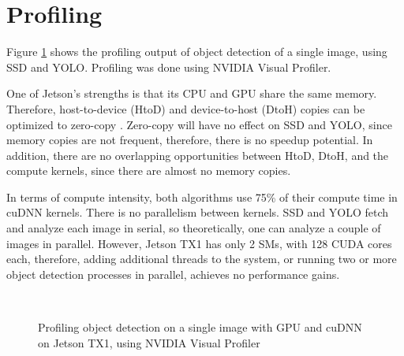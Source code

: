 \section{Profiling}
\label{sec:profiling}

Figure \ref{fig:profile} shows the profiling output of object detection of a single image, using SSD and YOLO. Profiling was done using NVIDIA Visual Profiler.

One of Jetson's strengths is that its CPU and GPU share the same memory. Therefore, host-to-device (HtoD) and device-to-host (DtoH) copies can be optimized to zero-copy \cite{tegrazerocopy}. Zero-copy will have no effect on SSD and YOLO, since memory copies are not frequent, therefore, there is no speedup potential. In addition, there are no overlapping opportunities between HtoD, DtoH, and the compute kernels, since there are almost no memory copies.

In terms of compute intensity, both algorithms use 75\% of their compute time in cuDNN kernels. There is no parallelism between kernels. SSD and YOLO fetch and analyze each image in serial, so theoretically, one can analyze a couple of images in parallel. However, Jetson TX1 has only 2 SMs, with 128 CUDA cores each, therefore, adding additional threads to the system, or running two or more object detection processes in parallel, achieves no performance gains.

\begin{figure}[t]
	\begin{center}
	 \\

	\caption{Profiling object detection on a single image with GPU and cuDNN on Jetson TX1, using NVIDIA Visual Profiler}
	\label{fig:profile}
	\end{center}
\end{figure}


